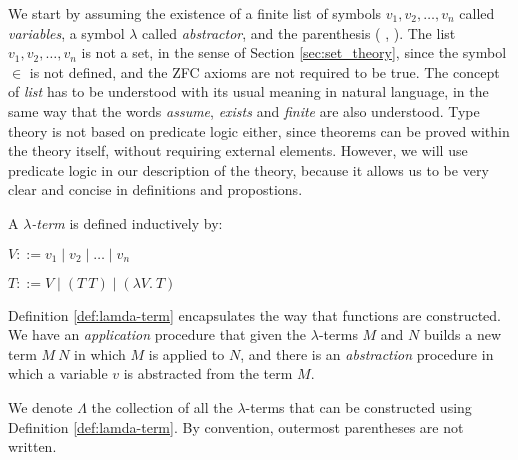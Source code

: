 We start by assuming the existence of a finite list of symbols $v_1, v_2, \ldots, v_n$ called \emph{variables}, a symbol $\lambda$ called \emph{abstractor}, and the parenthesis ( , ). The list $v_1, v_2, \ldots, v_n$ is not a set, in the sense of Section \ref{sec:set_theory}, since the symbol $\in$ is not defined, and the ZFC axioms are not required to be true. The concept of \emph{list} has to be understood with its usual meaning in natural language, in the same way that the words \emph{assume}, \emph{exists} and \emph{finite} are also understood. Type theory is not based on predicate logic either, since theorems can be proved within the theory itself, without requiring external elements. However, we will use predicate logic in our description of the theory, because it allows us to be very clear and concise in definitions and propostions.

\begin{definition}
\label{def:lamda-term}

A \emph{$\lambda$-term} is defined inductively by:

$V ::= v_1 \mid v_2 \mid \ldots \mid v_n$

$T ::= V \mid \left( T \: T \right) \mid \left( \lambda V. \: T \right)$

\end{definition}

Definition \ref{def:lamda-term} encapsulates the way that functions are constructed. We have an \emph{application} procedure that given the $\lambda$-terms $M$ and $N$ builds a new term $M \: N$ in which $M$ is applied to $N$, and there is an \emph{abstraction} procedure in which a variable $v$ is abstracted from the term $M$.

We denote $\Lambda$ the collection of all the $\lambda$-terms that can be constructed using Definition \ref{def:lamda-term}. By convention, outermost parentheses are not written.

\begin{example}
\end{example}




